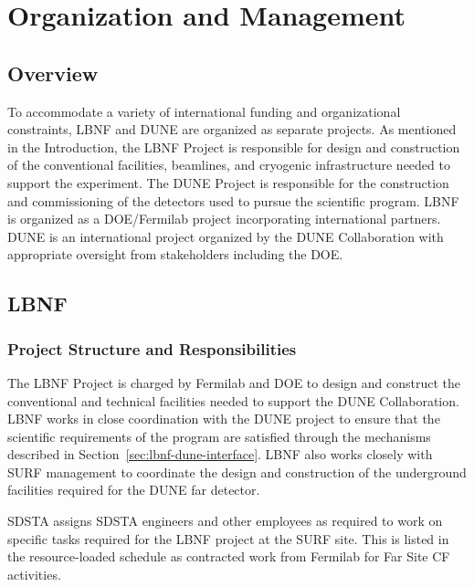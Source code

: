 \chapter{Organization and Management}
\label{v1ch:org-mgmt}

\section{Overview}

To accommodate a variety of international funding and organizational constraints, LBNF and DUNE are organized as separate projects. As mentioned in the Introduction, the LBNF Project is responsible for design and construction of the conventional facilities, beamlines, and cryogenic infrastructure needed to support the experiment.  The DUNE Project is responsible for the construction and commissioning of the detectors used to pursue the scientific program.  LBNF is organized as a DOE/Fermilab project incorporating international partners.   DUNE is an international project organized by the DUNE Collaboration with appropriate oversight from stakeholders including the DOE.

\section{LBNF}

\subsection{Project Structure and Responsibilities}

The LBNF Project is charged by Fermilab and DOE to design and construct the conventional and technical facilities needed to support the DUNE Collaboration.  LBNF works in close coordination with the DUNE project to ensure that the scientific requirements of the program are satisfied through the mechanisms described in Section~\ref{sec:lbnf-dune-interface}. LBNF also works closely with SURF management to coordinate the design and construction of the underground facilities required for the DUNE far detector. 

SDSTA assigns SDSTA engineers and other employees as required to work on specific tasks required for the LBNF project at the SURF site. This is listed in the resource-loaded schedule as contracted work from Fermilab for Far Site CF activities.  %


